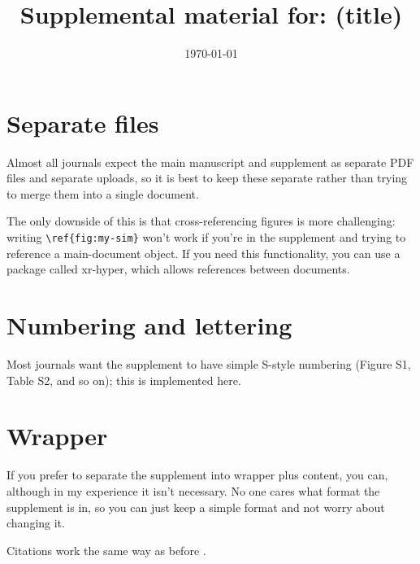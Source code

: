 \documentclass{article}
\title{Supplemental material for: (title)}
\date{\today}
\begin{document}
\maketitle

\section{Separate files}

Almost all journals expect the main manuscript and supplement as separate PDF files and separate uploads, so it is best to keep these separate rather than trying to merge them into a single document.

The only downside of this is that cross-referencing figures is more challenging: writing \verb|\ref{fig:my-sim}| won't work if you're in the supplement and trying to reference a main-document object. If you need this functionality, you can use a package called xr-hyper, which allows references between documents.

\section{Numbering and lettering}

Most journals want the supplement to have simple S-style numbering (Figure S1, Table S2, and so on); this is implemented here.

\section{Wrapper}

If you prefer to separate the supplement into wrapper plus content, you can, although in my experience it isn't necessary. No one cares what format the supplement is in, so you can just keep a simple format and not worry about changing it.

Citations work the same way as before \citep{Tibshirani1996}.



\end{document}
